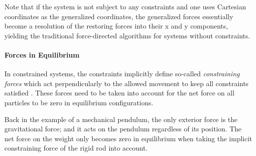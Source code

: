 Note that if the system is not subject to any constraints and one uses Cartesian coordinates as the generalized coordinates, the generalized forces essentially become a resolution of the restoring forces into their x and y components, yielding the traditional force-directed algorithms for systems without constraints.



\paragraph{Forces in Equilibrium}

In constrained systems, the constraints implicitly define so-called \emph{constraining forces} which act perpendicularly to the allowed movement to keep all constraints satisfied \cite{Fliessbach}. These forces need to be taken into account for the net force on all particles to be zero in equilibrium configurations.

Back in the example of a mechanical pendulum, the only exterior force is the gravitational force; and it acts on the pendulum regardless of its position. The net force on the weight only becomes zero in equilibrium when taking the implicit constraining force of the rigid rod into account.
